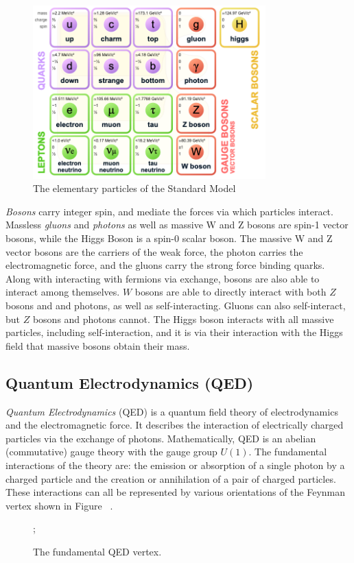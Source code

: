 \begin{figure}[h]
    \centering
    \includegraphics[width=0.8\textwidth]{Figures/1/sm.png}
    \caption{The elementary particles of the Standard Model}
    \label{fig:standardmodel}
\end{figure}

\textit{Bosons} carry integer spin, and mediate the forces via which particles interact. Massless \textit{gluons} and \textit{photons} as well as massive W and Z bosons are spin-1 vector bosons, while the Higgs Boson is a spin-0 scalar boson. The massive W and Z vector bosons are the carriers of the weak force, the photon carries the electromagnetic force, and the gluons carry the strong force binding quarks. Along with interacting with fermions via exchange, bosons are also able to interact among themselves. $W$ bosons are able to directly interact with both $Z$ bosons and and photons, as well as self-interacting. Gluons can also self-interact, but $Z$ bosons and photons cannot. The Higgs boson interacts with all massive particles, including self-interaction, and it is via their interaction with the Higgs field that massive bosons obtain their mass.

\subsection{Quantum Electrodynamics (QED)}
\textit{Quantum Electrodynamics} (QED) is a quantum field theory of electrodynamics and the electromagnetic force. It describes the interaction of electrically charged particles via the exchange of photons. Mathematically, QED is an abelian (commutative) gauge theory with the gauge group $U(1)$. The fundamental interactions of the theory are: the emission or absorption of a single photon by a charged particle and the creation or annihilation of a pair of charged particles. These interactions can all be represented by various orientations of the Feynman vertex shown in Figure ~. 
\begin{figure}[h!]
    \centering
    ;
    \caption{The fundamental QED vertex.}
    \label{fig:QEDvertex}
\end{figure}

